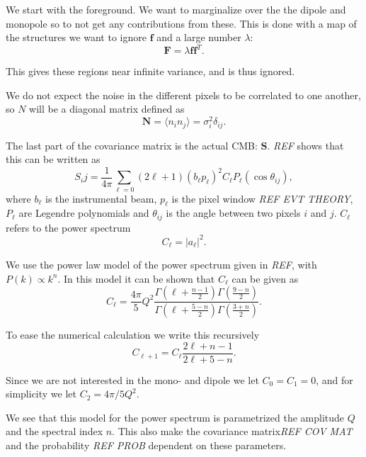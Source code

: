 \documentclass{emulateapj}
\begin{document}
We start with the foreground. We want to marginalize over the the dipole and monopole so to not get any contributions from these. This is done with a map of the structures we want to ignore $\mathbf{f}$ and a large number $\lambda$:
\begin{equation}
\mathbf{F} = \lambda \mathbf{f}\mathbf{f}^T.
\end{equation}

This gives these regions near infinite variance, and is thus ignored.

We do not expect the noise in the different pixels to be correlated to one another, so $N$ will be a diagonal matrix defined as
\begin{equation}
\mathbf{N} = \langle n_i n_j\rangle = \sigma_i^2\delta_{ij}.
\end{equation}

The last part of the covariance matrix is the actual CMB: $\mathbf{S}$. \emph{REF} shows that this can be written as 
\begin{equation}
S_ij = \frac{1}{4\pi}\sum_{\ell=0}(2\ell + 1)(b_\ell p_\ell)^2 C_\ell P_\ell(\cos\theta_{ij}),
\end{equation}
where $b_\ell$ is the instrumental beam, $p_\ell$ is the pixel window \emph{REF EVT THEORY}, $P_\ell$ are Legendre polynomials and $\theta_{ij}$ is the angle between two pixels $i$ and $j$. $C_\ell$ refers to the power spectrum 
\begin{equation}
C_\ell = |a_\ell|^2.
\end{equation}

We use the power law model of the power spectrum given in \emph{REF}, with $P(k) \propto k^n$. In this model it can be shown that $C_\ell$ can be given as
\begin{equation}
C_\ell = \frac{4\pi}{5}Q^2\frac{\Gamma\left(\ell + \frac{n-1}{2}\right)\Gamma\left(\frac{9-n}{2}\right)}{\Gamma\left(\ell + \frac{5-n}{2}\right)\Gamma\left(\frac{3+n}{2}\right)}.
\end{equation}

To ease the numerical calculation we write this recursively
\begin{equation}
C_{\ell + 1} = C_\ell \frac{2\ell + n -1}{2\ell + 5 - n}.
\end{equation}

Since we are not interested in the mono- and dipole we let $C_0 = C_1 = 0$, and for simplicity we let $C_2 = 4\pi/5Q^2$.

We see that this model for the power spectrum is parametrized the amplitude $Q$ and the spectral index $n$. This also make the covariance matrix\emph{REF COV MAT} and the probability \emph{REF PROB} dependent on these parameters.
\end{document}
